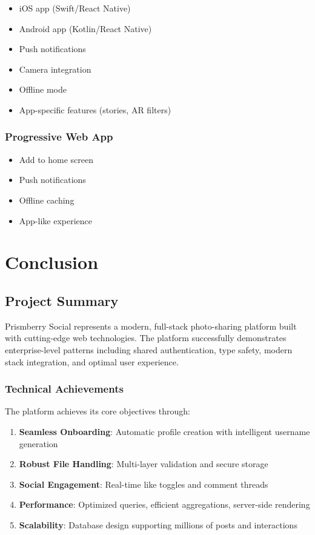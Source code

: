 \documentclass[12pt,a4paper]{report}
\begin{document}
\begin{itemize}
    \item iOS app (Swift/React Native)
    \item Android app (Kotlin/React Native)
    \item Push notifications
    \item Camera integration
    \item Offline mode
    \item App-specific features (stories, AR filters)
\end{itemize}

\subsection{Progressive Web App}

\begin{itemize}
    \item Add to home screen
    \item Push notifications
    \item Offline caching
    \item App-like experience
\end{itemize}

\chapter{Conclusion}

\section{Project Summary}

Prismberry Social represents a modern, full-stack photo-sharing platform built with cutting-edge web technologies. The platform successfully demonstrates enterprise-level patterns including shared authentication, type safety, modern stack integration, and optimal user experience.

\subsection{Technical Achievements}

The platform achieves its core objectives through:

\begin{enumerate}
    \item \textbf{Seamless Onboarding}: Automatic profile creation with intelligent username generation
    \item \textbf{Robust File Handling}: Multi-layer validation and secure storage
    \item \textbf{Social Engagement}: Real-time like toggles and comment threads
    \item \textbf{Performance}: Optimized queries, efficient aggregations, server-side rendering
    \item \textbf{Scalability}: Database design supporting millions of posts and interactions
\end{enumerate}
\end{document}
